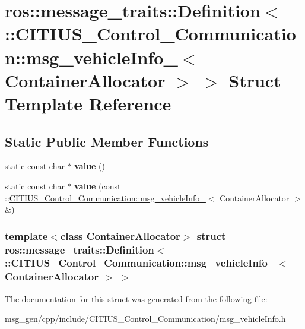 \hypertarget{structros_1_1message__traits_1_1_definition_3_01_1_1_c_i_t_i_u_s___control___communication_1_1msb15872eb5380137ba8f6bc5efd96042c}{\section{ros\-:\-:message\-\_\-traits\-:\-:\-Definition$<$ \-:\-:\-C\-I\-T\-I\-U\-S\-\_\-\-Control\-\_\-\-Communication\-:\-:msg\-\_\-vehicle\-Info\-\_\-$<$ \-Container\-Allocator $>$ $>$ \-Struct \-Template \-Reference}
\label{structros_1_1message__traits_1_1_definition_3_01_1_1_c_i_t_i_u_s___control___communication_1_1msb15872eb5380137ba8f6bc5efd96042c}
}
\subsection*{\-Static \-Public \-Member \-Functions}
\begin{DoxyCompactItemize}
\item 
\hypertarget{structros_1_1message__traits_1_1_definition_3_01_1_1_c_i_t_i_u_s___control___communication_1_1msb15872eb5380137ba8f6bc5efd96042c_ac5ab23c72740973497447d1b63ed540d}{static const char $\ast$ {\bfseries value} ()}\label{structros_1_1message__traits_1_1_definition_3_01_1_1_c_i_t_i_u_s___control___communication_1_1msb15872eb5380137ba8f6bc5efd96042c_ac5ab23c72740973497447d1b63ed540d}

\item 
\hypertarget{structros_1_1message__traits_1_1_definition_3_01_1_1_c_i_t_i_u_s___control___communication_1_1msb15872eb5380137ba8f6bc5efd96042c_a692b62b70d291df971cfec5c2d891159}{static const char $\ast$ {\bfseries value} (const \-::\hyperlink{struct_c_i_t_i_u_s___control___communication_1_1msg__vehicle_info__}{\-C\-I\-T\-I\-U\-S\-\_\-\-Control\-\_\-\-Communication\-::msg\-\_\-vehicle\-Info\-\_\-}$<$ \-Container\-Allocator $>$ \&)}\label{structros_1_1message__traits_1_1_definition_3_01_1_1_c_i_t_i_u_s___control___communication_1_1msb15872eb5380137ba8f6bc5efd96042c_a692b62b70d291df971cfec5c2d891159}

\end{DoxyCompactItemize}
\subsubsection*{template$<$class Container\-Allocator$>$ struct ros\-::message\-\_\-traits\-::\-Definition$<$ \-::\-C\-I\-T\-I\-U\-S\-\_\-\-Control\-\_\-\-Communication\-::msg\-\_\-vehicle\-Info\-\_\-$<$ Container\-Allocator $>$ $>$}



\-The documentation for this struct was generated from the following file\-:\begin{DoxyCompactItemize}
\item 
msg\-\_\-gen/cpp/include/\-C\-I\-T\-I\-U\-S\-\_\-\-Control\-\_\-\-Communication/msg\-\_\-vehicle\-Info.\-h\end{DoxyCompactItemize}
